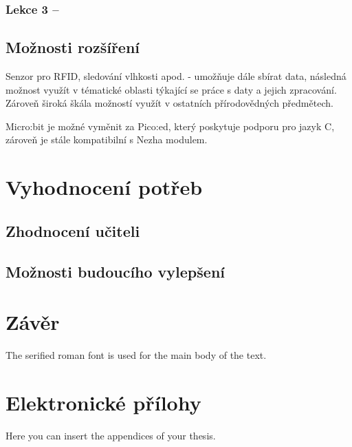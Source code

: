 \documentclass[
  digital,     %
  oneside,     %
  nosansbold,  %
  colorbold, %
  lof,         %
  nolot,         %
]{fithesis4}
\begin{document}
\subsection{Lekce 3 -- }

\section{Možnosti rozšíření}
Senzor pro RFID, sledování vlhkosti apod. - umožňuje dále sbírat data, následná možnost využít v tématické oblasti týkající se práce s daty a jejich zpracování. Zároveň široká škála možností využít v ostatních přírodovědných předmětech.

Micro:bit je možné vyměnit za Pico:ed, který poskytuje podporu pro jazyk C, zároveň je stále kompatibilní s Nezha modulem. 

\chapter{Vyhodnocení potřeb}

\section{Zhodnocení učiteli}

\section{Možnosti budoucího vylepšení}


\chapter{Závěr}
The serified roman font is used for the main body of the text.


\printbibliography[heading=bibintoc] %

  \makeatletter\thesis@blocks@clear\makeatother
  \printindex

\appendix %
\chapter{Elektronické přílohy}
Here you can insert the appendices of your thesis.
\end{document}
